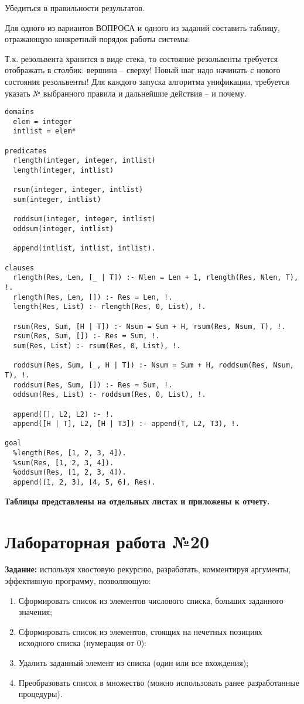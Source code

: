 Убедиться в правильности результатов.

Для одного из вариантов ВОПРОСА и одного из заданий составить таблицу, отражающую конкретный порядок работы системы:

Т.к. резольвента хранится в виде стека, то состояние резольвенты требуется отображать в столбик: вершина – сверху! Новый шаг надо начинать с нового состояния резольвенты! Для каждого запуска алгоритма унификации, требуется указать № выбранного правила и дальнейшие действия – и почему.

\begin{lstlisting}
domains
  elem = integer
  intlist = elem*

predicates
  rlength(integer, integer, intlist)
  length(integer, intlist)

  rsum(integer, integer, intlist)
  sum(integer, intlist)

  roddsum(integer, integer, intlist)
  oddsum(integer, intlist)

  append(intlist, intlist, intlist).

clauses
  rlength(Res, Len, [_ | T]) :- Nlen = Len + 1, rlength(Res, Nlen, T), !.
  rlength(Res, Len, []) :- Res = Len, !.
  length(Res, List) :- rlength(Res, 0, List), !.

  rsum(Res, Sum, [H | T]) :- Nsum = Sum + H, rsum(Res, Nsum, T), !.
  rsum(Res, Sum, []) :- Res = Sum, !.
  sum(Res, List) :- rsum(Res, 0, List), !.

  roddsum(Res, Sum, [_, H | T]) :- Nsum = Sum + H, roddsum(Res, Nsum, T), !.
  roddsum(Res, Sum, []) :- Res = Sum, !.
  oddsum(Res, List) :- roddsum(Res, 0, List), !.

  append([], L2, L2) :- !.
  append([H | T], L2, [H | T3]) :- append(T, L2, T3), !.

goal
  %length(Res, [1, 2, 3, 4]).
  %sum(Res, [1, 2, 3, 4]).
  %oddsum(Res, [1, 2, 3, 4]).
  append([1, 2, 3], [4, 5, 6], Res).
\end{lstlisting}

\textbf{Таблицы представлены на отдельных листах и приложены к отчету.}

\chapter{Лабораторная работа №20}

\textbf{Задание:} используя хвостовую рекурсию, разработать, комментируя аргументы, эффективную программу, позволяющую:
\begin{enumerate}
    \item Сформировать список из элементов числового списка, больших заданного значения;
    \item Сформировать список из элементов, стоящих на нечетных позициях исходного списка (нумерация от 0):
    \item Удалить заданный элемент из списка (один или все вхождения);
    \item Преобразовать список в множество (можно использовать ранее разработанные процедуры).
\end{enumerate}

